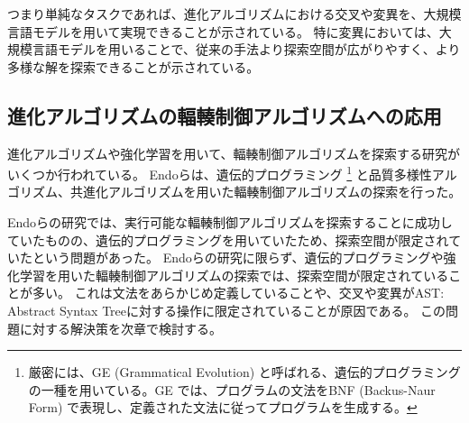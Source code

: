 \documentclass[a4paper,11pt]{jreport}
\begin{document}
つまり単純なタスクであれば、進化アルゴリズムにおける交叉や変異を、大規模言語モデルを用いて実現できることが示されている。
特に変異においては、大規模言語モデルを用いることで、従来の手法より探索空間が広がりやすく、より多様な解を探索できることが示されている。

\subsection{進化アルゴリズムの輻輳制御アルゴリズムへの応用}
\label{subsection:evolutionary-algorithm}

進化アルゴリズムや強化学習を用いて、輻輳制御アルゴリズムを探索する研究がいくつか行われている。
Endoら\cite{endo-2022-toward}は、遺伝的プログラミング\cite{holland1992adaptation, gp, gp-foundation}
\footnote{厳密には、GE (Grammatical Evolution) \cite{grammatical-evolution}と呼ばれる、遺伝的プログラミングの一種を用いている。GE では、プログラムの文法をBNF (Backus-Naur Form) で表現し、定義された文法に従ってプログラムを生成する。}
と品質多様性アルゴリズム\cite{quality-diversity}、共進化アルゴリズム\cite{poet, poet-gecco}を用いた輻輳制御アルゴリズムの探索を行った。

Endoらの研究では、実行可能な輻輳制御アルゴリズムを探索することに成功していたものの、遺伝的プログラミングを用いていたため、探索空間が限定されていたという問題があった。
Endoらの研究に限らず、遺伝的プログラミングや強化学習を用いた輻輳制御アルゴリズムの探索では、探索空間が限定されていることが多い。
これは文法をあらかじめ定義していることや、交叉や変異がAST: Abstract Syntax Treeに対する操作に限定されていることが原因である。
この問題に対する解決策を次章で検討する。

\newpage
\end{document}
